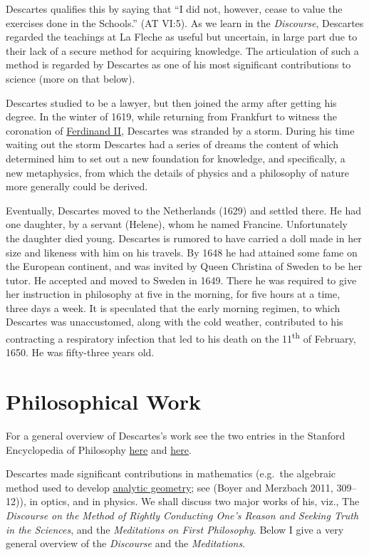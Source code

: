 \documentclass[12pt]{article}
\makeatletter
\newcommand{\citeprocitem}[2]{\hyper@linkstart{cite}{citeproc_bib_item_#1}#2\hyper@linkend}
\makeatother
\begin{document}
Descartes qualifies this by saying that ``I did not, however, cease to value the
exercises done in the Schools.'' (AT VI:5). As we learn in the \emph{Discourse}, Descartes
regarded the teachings at La Fleche as useful but uncertain, in large part due to
their lack of a secure method for acquiring knowledge. The articulation of such a
method is regarded by Descartes as one of his most significant contributions to
science (more on that below).

Descartes studied to be a lawyer, but then joined the army after getting his degree.
In the winter of 1619, while returning from Frankfurt to witness the coronation of
\href{http://en.wikipedia.org/wiki/Ferdinand\_II,\_Holy\_Roman\_Emperor}{Ferdinand II}, Descartes was stranded by a storm. During his time waiting out the
storm Descartes had a series of dreams the content of which determined him to set out
a new foundation for knowledge, and specifically, a new metaphysics, from which the
details of physics and a philosophy of nature more generally could be derived.

Eventually, Descartes moved to the Netherlands (1629) and settled there. He had one
daughter, by a servant (Helene), whom he named Francine. Unfortunately the daughter
died young. Descartes is rumored to have carried a doll made in her size and likeness
with him on his travels. By 1648 he had attained some fame on the European continent,
and was invited by Queen Christina of Sweden to be her tutor. He accepted and moved
to Sweden in 1649. There he was required to give her instruction in philosophy at
five in the morning, for five hours at a time, three days a week. It is speculated
that the early morning regimen, to which Descartes was unaccustomed, along with the
cold weather, contributed to his contracting a respiratory infection that led to his
death on the 11\textsuperscript{th} of February, 1650. He was fifty-three years old.

\section{Philosophical Work}
\label{sec:org17caa75}
For a general overview of Descartes's work see the two entries in the Stanford
Encyclopedia of Philosophy \href{http://plato.stanford.edu/entries/descartes/}{here} and \href{http://plato.stanford.edu/entries/descartes-works/}{here}.

Descartes made significant contributions in mathematics (e.g. the algebraic method
used to develop \href{http://en.wikipedia.org/wiki/Analytic\_geometry}{analytic geometry}; see (\citeprocitem{1}{Boyer and Merzbach 2011, 309–12})), in optics, and in
physics. We shall discuss two major works of his, viz., The \emph{Discourse on the Method
of Rightly Conducting One's Reason and Seeking Truth in the Sciences}, and the
\emph{Meditations on First Philosophy}. Below I give a very general overview of the
\emph{Discourse} and the \emph{Meditations}.
\end{document}
